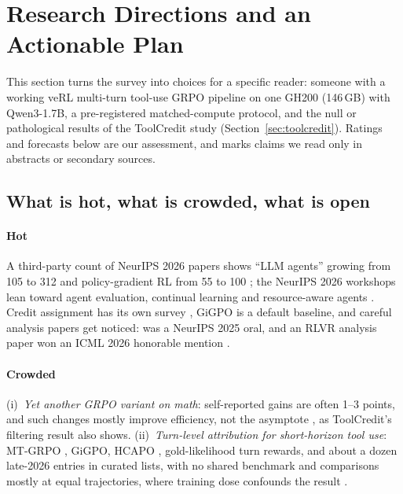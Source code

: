 \section{Research Directions and an Actionable Plan}\label{sec:agenda}

This section turns the survey into choices for a specific reader: someone with a working veRL multi-turn tool-use GRPO pipeline on one GH200 (146\,GB) with Qwen3-1.7B, a pre-registered matched-compute protocol, and the null or pathological results of the ToolCredit study (Section~\ref{sec:toolcredit}). Ratings and forecasts below are our assessment, and \unverified{} marks claims we read only in abstracts or secondary sources.

\subsection{What is hot, what is crowded, what is open}

\paragraph{Hot}
A third-party count of NeurIPS 2026 papers shows ``LLM agents'' growing from 105 to 312 and policy-gradient RL from 55 to 100 \citep{scime2026neurips}\unverified; the NeurIPS 2026 workshops lean toward agent evaluation, continual learning and resource-aware agents \citep{neurips2026announcing}. Credit assignment has its own survey \citep{zhang2026from}, GiGPO \citep{feng2025group} is a default baseline, and careful analysis papers get noticed: \citet{yue2025does} was a NeurIPS 2025 oral, and an RLVR analysis paper won an ICML 2026 honorable mention \citep{icml2026awards}.

\paragraph{Crowded}
(i)~\emph{Yet another GRPO variant on math}: self-reported gains are often 1--3 points\unverified, and such changes mostly improve efficiency, not the asymptote \citep{khatri2025art}, as ToolCredit's filtering result also shows. (ii)~\emph{Turn-level attribution for short-horizon tool use}: MT-GRPO \citep{wei2025reinforcing}, GiGPO, HCAPO \citep{tan2026hindsight}, gold-likelihood turn rewards, and about a dozen late-2026 entries in curated lists\unverified, with no shared benchmark and comparisons mostly at equal trajectories, where training dose confounds the result \citep{zhang2026credit}.

